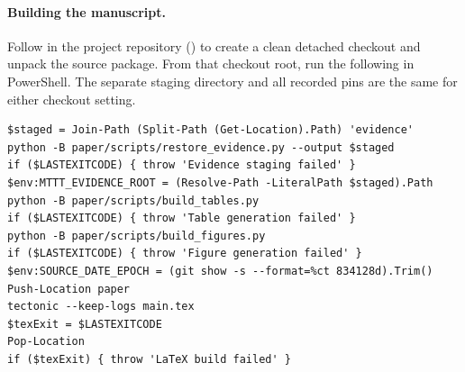 \paragraph{Building the manuscript.}
Follow  in the project repository (\RepoLink{}) to create a clean detached checkout and unpack the source package. From that checkout root, run the following in PowerShell. The separate staging directory and all recorded pins are the same for either checkout setting.
\begin{commandblock}
\begin{verbatim}
$staged = Join-Path (Split-Path (Get-Location).Path) 'evidence'
python -B paper/scripts/restore_evidence.py --output $staged
if ($LASTEXITCODE) { throw 'Evidence staging failed' }
$env:MTTT_EVIDENCE_ROOT = (Resolve-Path -LiteralPath $staged).Path
python -B paper/scripts/build_tables.py
if ($LASTEXITCODE) { throw 'Table generation failed' }
python -B paper/scripts/build_figures.py
if ($LASTEXITCODE) { throw 'Figure generation failed' }
$env:SOURCE_DATE_EPOCH = (git show -s --format=%ct 834128d).Trim()
Push-Location paper
tectonic --keep-logs main.tex
$texExit = $LASTEXITCODE
Pop-Location
if ($texExit) { throw 'LaTeX build failed' }
\end{verbatim}
\end{commandblock}

